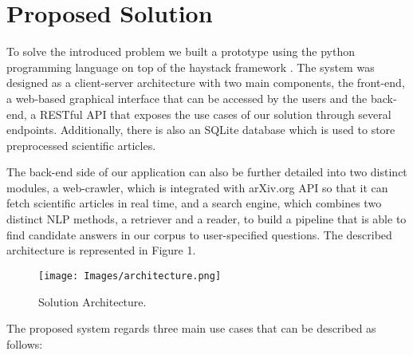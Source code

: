 \documentclass[runningheads]{llncs}
\begin{document}

\section{Proposed Solution}
\label{section:proposed-solution}

To solve the introduced problem we built a prototype using the python programming language on top of the haystack framework \cite{haystack}. The system was designed as a client-server architecture with two main components, the front-end, a web-based graphical interface that can be accessed by the users and the back-end, a RESTful API that exposes the use cases of our solution through several endpoints. Additionally, there is also an SQLite database which is used to store preprocessed scientific articles.

The back-end side of our application can also be further detailed into two distinct modules, a web-crawler, which is integrated with arXiv.org API so that it can fetch scientific articles in real time, and a search engine, which combines two distinct NLP methods, a retriever and a reader, to build a pipeline that is able to find candidate answers in our corpus to user-specified questions. The described architecture is represented in Figure 1.

\begin{figure}[H]
\centering
\texttt{[image: Images/architecture.png]}
\caption{Solution Architecture.}
\end{figure}

The proposed system regards three main use cases that can be described as follows:
\end{document}
